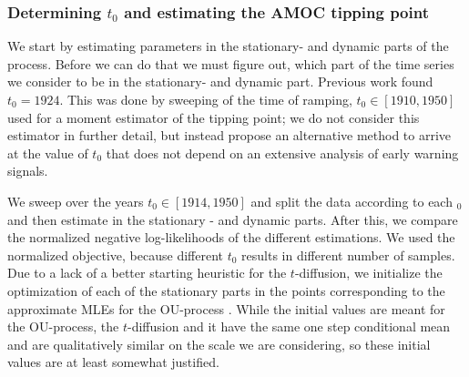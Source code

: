 \subsubsection{Determining \texorpdfstring{$t_0$}{t0} and estimating the AMOC tipping point}
We start by estimating parameters in the stationary- and dynamic parts of the process. Before we can do that we must figure out, which part of the time series we consider to be in the stationary- and dynamic part. Previous work found $t_0 = 1924$. This was done by sweeping of the time of ramping, $t_0 \in [1910, 1950]$ used for a moment estimator of the tipping point; we do not consider this estimator in further detail, but instead propose an alternative method to arrive at the value of $t_0$ that does not depend on an extensive analysis of early warning signals. 

We sweep over the years $t_0 \in [1914, 1950]$ and split the data according to each $_0$ and then estimate in the stationary - and dynamic parts. After this, we compare the normalized negative log-likelihoods of the different estimations. We used the normalized objective, because different $t_0$ results in different number of samples. Due to a lack of a better starting heuristic for the $t$-diffusion, we initialize the optimization of each of the stationary parts in the points corresponding to the approximate MLEs for the OU-process \cite[equation (S4-S6)]{DitlevsenSupplementary}. While the initial values are meant for the OU-process, the $t$-diffusion and it have the same one step conditional mean and are qualitatively similar on the scale we are considering, so these initial values are at least somewhat justified.

